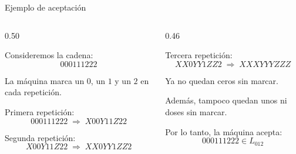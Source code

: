 \documentclass[aspectratio=1610, 12pt]{beamer}
\begin{document}
\begin{frame}[t]{Ejemplo de aceptación}
\vspace{4pt}
\begin{columns}[T]

  \begin{column}{0.50\textwidth}
    \begin{exbox}[Entrada]
      \footnotesize
      Consideremos la cadena:
      \[
        000111222
      \]

      \vspace{4pt}
      La máquina marca un $0$, un $1$ y un $2$ en cada repetición.

      \vspace{4pt}
      Primera repetición:
      \[
        000111222
        \;\Rightarrow\;
        X00Y11Z22
      \]

      Segunda repetición:
      \[
        X00Y11Z22
        \;\Rightarrow\;
        XX0YY1ZZ2
      \]
    \end{exbox}
  \end{column}

  \begin{column}{0.46\textwidth}
    \begin{defbox}[Resultado]
      \footnotesize
      Tercera repetición:
      \[
        XX0YY1ZZ2
        \;\Rightarrow\;
        XXXYYYZZZ
      \]

      \vspace{4pt}
      Ya no quedan ceros sin marcar.

      \vspace{4pt}
      Además, tampoco quedan unos ni doses sin marcar.

      \vspace{4pt}
      Por lo tanto, la máquina acepta:
      \[
        000111222 \in L_{012}
      \]
    \end{defbox}
  \end{column}

\end{columns}
\end{frame}
\end{document}
